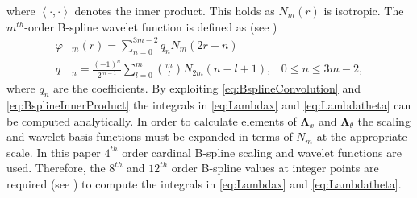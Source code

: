 \documentclass[journal]{IEEEtran}
\newcommand{\cut}[1]{\textcolor{cyan}{#1}}
\begin{document}
where $\left\langle \cdot,\cdot\right\rangle $ denotes the inner product. This holds as $N_m\left(r\right)$ is isotropic. The $m^{th}$-order B-spline wavelet function is defined as (see \cite{Chui1992}) 
\begin{align}
 \varphi & _{m}\left(r\right) = \sum_{n=0}^{3m-2} q_n N_{m}\left(2r-n\right) \\
 q & _n = \frac{\left(-1\right)^n}{2^{m-1}} \sum_{l=0}^{m} \binom{m}{l} N_{2m}\left(n-l+1\right), \,  \text{ $0\le n\le 3m-2$},
\end{align}
where $q_n$ are the coefficients. By exploiting \eqref{eq:BsplineConvolution} and \eqref{eq:BsplineInnerProduct} the integrals in \eqref{eq:Lambdax} and \eqref{eq:Lambdatheta} can be computed analytically. In order to calculate elements of $\boldsymbol\Lambda_{x}$ and $\boldsymbol\Lambda_{\theta}$ the scaling and wavelet basis functions must be expanded in terms of $N_m$ at the appropriate scale. In this paper $4^{th}$ order cardinal B-spline scaling and wavelet functions are used. Therefore, the $8^{th}$ and $12^{th}$ order B-spline values at integer points are required (see \cite{Goswami1999}) to compute the integrals in \eqref{eq:Lambdax} and \eqref{eq:Lambdatheta}.

\end{document}
